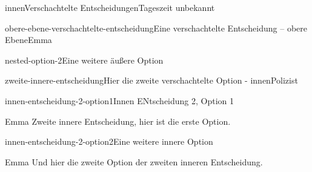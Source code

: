 \documentclass[12pt]{article}
\begin{document}
\begin{scene}{innen}{Verschachtelte Entscheidungen}{Tageszeit unbekannt}
\begin{decision}{obere-ebene-verschachtelte-entscheidung}{Eine verschachtelte Entscheidung -- obere Ebene}{Emma}
\begin{option}{nested-option-2}{Eine weitere äußere Option}
\begin{decision}{zweite-innere-entscheidung}{Hier die zweite verschachtelte Option - innen}{Polizist}
                    \begin{option}{innen-entscheidung-2-option1}{Innen ENtscheidung 2, Option 1}
                        \begin{dialog}{Emma}
                            Zweite innere Entscheidung, hier ist die erste Option.
                        \end{dialog}
                    \end{option}
                    \begin{option}{innen-entscheidung-2-option2}{Eine weitere innere Option}
                        \begin{dialog}{Emma}
                            Und hier die zweite Option der zweiten inneren Entscheidung.
                        \end{dialog}
                    \end{option}
                \end{decision}
            \end{option}
        \end{decision}
    \end{scene}
\end{document}
